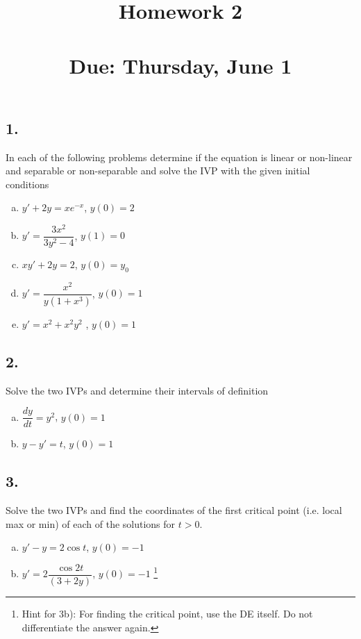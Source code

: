 



\title{Homework 2 \\ \hfill \\ Due: Thursday, June 1}


\maketitle

\thispagestyle{fancy}

\setlength\itemsep{2em}






\subsection*{1. }
In each of the following problems determine if the equation is linear or non-linear and separable or non-separable and solve the IVP with the given initial conditions

\begin{enumerate}[a)]
	\item $y' + 2 y = x e ^ {-x}$, $ y(0)= 2 $
	\item $y' = \dfrac{3 x ^ 2}{  3y ^2 - 4} $, $ y(1) = 0$
	\item $ x y' + 2 y = 2 $, $ y(0) = y _ 0 $
	\item $ y' = \dfrac{x ^ 2 }{ y(1 + x ^ 3)} $, $ y(0) = 1 $
	\item $ y' = x ^ 2 + x^2 y ^ 2$ , $ y(0) = 1 $
\end{enumerate}
\vspace{1em}

\subsection*{2. }
Solve the two IVPs and determine their intervals of definition
\begin{enumerate}[a)]
	\item $\dfrac{dy}{dt} = y^2$, $y(0)= 1$
	\item $y - y' = t $, $y(0)= 1$
\end{enumerate}
\vspace{1em}




\subsection*{3. }
Solve the two IVPs and find the coordinates of the first critical point (i.e. local max or min) of each of the solutions for $ t > 0 $.
\begin{enumerate}[a)]
	\item $y ' - y = 2 \cos t$, $y(0) = -1$
	\item $ y' = 2 \dfrac{\cos 2t}{(3 + 2y)}$, $ y(0) = -1 $ \footnote{Hint for 3b): For finding the critical point, use the DE itself. Do not differentiate the answer again.}
\end{enumerate}
\vspace{1em}


